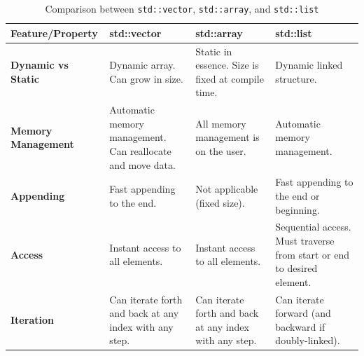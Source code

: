 \begin{table}[h]
    \centering
    \caption{Comparison between \texttt{std::vector}, \texttt{std::array}, and \texttt{std::list}}
    \begin{tabularx}{\textwidth}{lXXX}
        \toprule
        \textbf{Feature/Property}   & \textbf{std::vector}                                                                                                             & \textbf{std::array}                                                                                & \textbf{std::list}                                                                          \\
        \midrule
        \textbf{Dynamic vs Static}  & Dynamic array. Can grow in size.                                                                                                 & Static in essence. Size is fixed at compile time.                                                  & Dynamic linked structure.                                                                   \\
        \textbf{Memory Management}  & Automatic memory management. Can reallocate and move data.                                                                       & All memory management is on the user.                                                              & Automatic memory management.                                                                \\
        \textbf{Appending}          & Fast appending to the end.                                                                                                       & Not applicable (fixed size).                                                                       & Fast appending to the end or beginning.                                                     \\
        \textbf{Access}             & Instant access to all elements.                                                                                                  & Instant access to all elements.                                                                    & Sequential access. Must traverse from start or end to desired element.                      \\
        \textbf{Iteration}          & Can iterate forth and back at any index with any step.                                                                           & Can iterate forth and back at any index with any step.                                             & Can iterate forward (and backward if doubly-linked).                                        \\

\end{tabularx}
\end{table}
